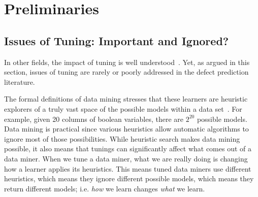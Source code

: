 \documentclass{sig-alternative}
\begin{document}


\section{Preliminaries}
\subsection{Issues of Tuning: Important and Ignored?}
In  other fields, the impact of tuning is well understood~\cite{Bergstra2012}. 
Yet, as argued in this section, issues of tuning  are rarely or poorly addressed
in the defect prediction literature.

The formal definitions of data mining stresses that these learners are heuristic explorers
of a truly   vast space of the possible models within a data set~\cite{mitchell1982generalization}. For example, given 20 columns of boolean variables,
there are $2^{20}$ possible models. Data mining is practical since various heuristics
allow automatic algorithms to ignore most of those possibilities. 
While  heuristic search makes data mining possible, it also means that tunings
can significantly affect what comes out of a data miner.
When we tune a data miner, what we are really doing is changing how a learner applies
its heuristics. This means tuned data miners use different heuristics, which means they ignore different possible models, which means they return different models; i.e.  {\em how} we learn changes {\em what} we learn.
\end{document}
